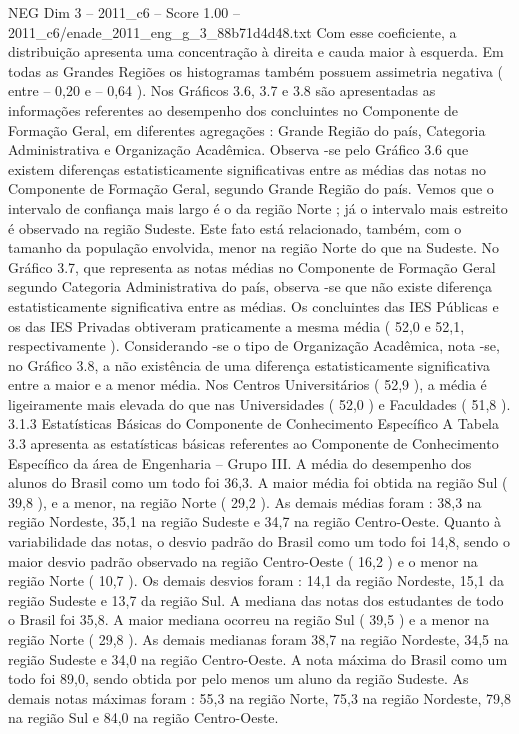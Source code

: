 \begin{textsample}{NEG Dim 3 – 2011\_c6 – Score 1.00 – 2011\_c6/enade\_2011\_eng\_g\_3\_88b71d4d48.txt}
Com esse coeficiente, a distribuição apresenta uma concentração à direita e cauda maior à esquerda.
Em todas as Grandes Regiões os histogramas também possuem assimetria negativa ( entre – 0,20 e – 0,64 ).
Nos Gráficos 3.6, 3.7 e 3.8 são apresentadas as informações referentes ao desempenho dos concluintes no Componente de Formação Geral, em diferentes agregações : Grande Região do país, Categoria Administrativa e Organização Acadêmica.
Observa -se pelo Gráfico 3.6 que existem diferenças estatisticamente significativas entre as médias das notas no Componente de Formação Geral, segundo Grande Região do país.
Vemos que o intervalo de confiança mais largo é o da região Norte ; já o intervalo mais estreito é observado na região Sudeste.
Este fato está relacionado, também, com o tamanho da população envolvida, menor na região Norte do que na Sudeste.
No Gráfico 3.7, que representa as notas médias no Componente de Formação Geral segundo Categoria Administrativa do país, observa -se que não existe diferença estatisticamente significativa entre as médias.
Os concluintes das IES Públicas e os das IES Privadas obtiveram praticamente a mesma média ( 52,0 e 52,1, respectivamente ).
Considerando -se o tipo de Organização Acadêmica, nota -se, no Gráfico 3.8, a não existência de uma diferença estatisticamente significativa entre a maior e a menor média.
Nos Centros Universitários ( 52,9 ), a média é ligeiramente mais elevada do que nas Universidades ( 52,0 ) e Faculdades ( 51,8 ). 3.1.3 Estatísticas Básicas do Componente de Conhecimento Específico A Tabela 3.3 apresenta as estatísticas básicas referentes ao Componente de Conhecimento Específico da área de Engenharia – Grupo III.
A média do desempenho dos alunos do Brasil como um todo foi 36,3.
A maior média foi obtida na região Sul ( 39,8 ), e a menor, na região Norte ( 29,2 ).
As demais médias foram : 38,3 na região Nordeste, 35,1 na região Sudeste e 34,7 na região Centro-Oeste.
Quanto à variabilidade das notas, o desvio padrão do Brasil como um todo foi 14,8, sendo o maior desvio padrão observado na região Centro-Oeste ( 16,2 ) e o menor na região Norte ( 10,7 ).
Os demais desvios foram : 14,1 da região Nordeste, 15,1 da região Sudeste e 13,7 da região Sul.
A mediana das notas dos estudantes de todo o Brasil foi 35,8.
A maior mediana ocorreu na região Sul ( 39,5 ) e a menor na região Norte ( 29,8 ).
As demais medianas foram 38,7 na região Nordeste, 34,5 na região Sudeste e 34,0 na região Centro-Oeste.
A nota máxima do Brasil como um todo foi 89,0, sendo obtida por pelo menos um aluno da região Sudeste.
As demais notas máximas foram : 55,3 na região Norte, 75,3 na região Nordeste, 79,8 na região Sul e 84,0 na região Centro-Oeste.

\end{textsample}
